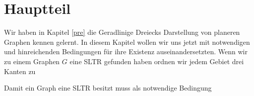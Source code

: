 \chapter{Hauptteil}

Wir haben in Kapitel \ref{pre} die Geradlinige Dreiecks Darstellung von planeren Graphen kennen gelernt. In diesem Kapitel wollen wir uns jetzt mit notwendigen und hinreichenden Bedingungen für ihre Existenz auseinandersetzten. Wenn wir zu einem Graphen $G$ eine SLTR gefunden haben ordnen wir jedem Gebiet drei Kanten zu

Damit ein Graph eine SLTR besitzt muss als notwendige Bedingung 
